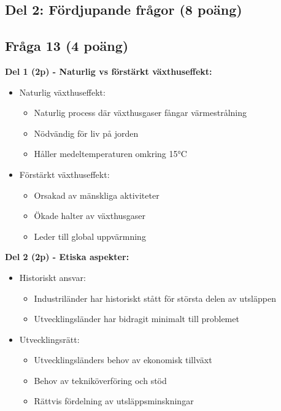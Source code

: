 \documentclass[a4paper]{article}
\begin{document}
\begin{enumerate}
\break

\section*{Del 2: Fördjupande frågor (8 poäng)}

\subsection*{Fråga 13 (4 poäng)}
\textbf{Del 1 (2p) - Naturlig vs förstärkt växthuseffekt:}
\begin{itemize}
\item Naturlig växthuseffekt:
  \begin{itemize}
  \item Naturlig process där växthusgaser fångar värmestrålning
  \item Nödvändig för liv på jorden
  \item Håller medeltemperaturen omkring 15°C
  \end{itemize}
\item Förstärkt växthuseffekt:
  \begin{itemize}
  \item Orsakad av mänskliga aktiviteter
  \item Ökade halter av växthusgaser
  \item Leder till global uppvärmning
  \end{itemize}
\end{itemize}

\textbf{Del 2 (2p) - Etiska aspekter:}
\begin{itemize}
\item Historiskt ansvar:
  \begin{itemize}
  \item Industriländer har historiskt stått för största delen av utsläppen
  \item Utvecklingsländer har bidragit minimalt till problemet
  \end{itemize}
\item Utvecklingsrätt:
  \begin{itemize}
  \item Utvecklingsländers behov av ekonomisk tillväxt
  \item Behov av tekniköverföring och stöd
  \item Rättvis fördelning av utsläppsminskningar
  \end{itemize}
\end{itemize}


\end{enumerate}
\end{document}

